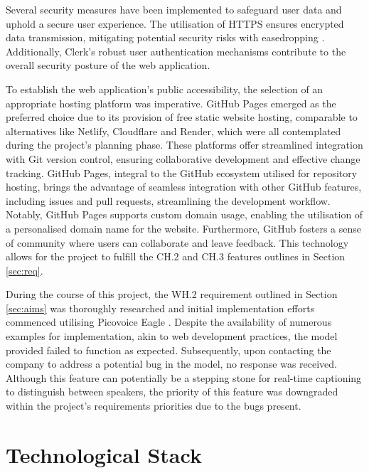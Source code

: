 \documentclass{l4proj}
\begin{document}
Several security measures have been implemented to safeguard user data and uphold a secure user experience. The utilisation of HTTPS ensures encrypted data transmission, mitigating potential security risks with easedropping \citep{kroger2019my}. Additionally, Clerk's robust user authentication mechanisms contribute to the overall security posture of the web application.

To establish the web application's public accessibility, the selection of an appropriate hosting platform was imperative. GitHub Pages emerged as the preferred choice due to its provision of free static website hosting, comparable to alternatives like Netlify, Cloudflare and Render, which were all contemplated during the project's planning phase. These platforms offer streamlined integration with Git version control, ensuring collaborative development and effective change tracking. GitHub Pages, integral to the GitHub ecosystem utilised for repository hosting, brings the advantage of seamless integration with other GitHub features, including issues and pull requests, streamlining the development workflow. Notably, GitHub Pages supports custom domain usage, enabling the utilisation of a personalised domain name for the website. Furthermore, GitHub fosters a sense of community where users can collaborate and leave feedback. This technology allows for the project to fulfill the CH.2 and CH.3 features outlines in Section \ref{sec:req}.

During the course of this project, the WH.2 requirement outlined in Section \ref{sec:aims} was thoroughly researched and initial implementation efforts commenced utilising Picovoice Eagle \citep{PicovoiceWordmark}. Despite the availability of numerous examples for implementation, akin to web development practices, the model provided failed to function as expected. Subsequently, upon contacting the company to address a potential bug in the model, no response was received. Although this feature can potentially be a stepping stone for real-time captioning to distinguish between speakers, the priority of this feature was downgraded within the project's requirements priorities due to the bugs present. 

\section{Technological Stack}
\label{sec:tech-stack}

\end{document}
